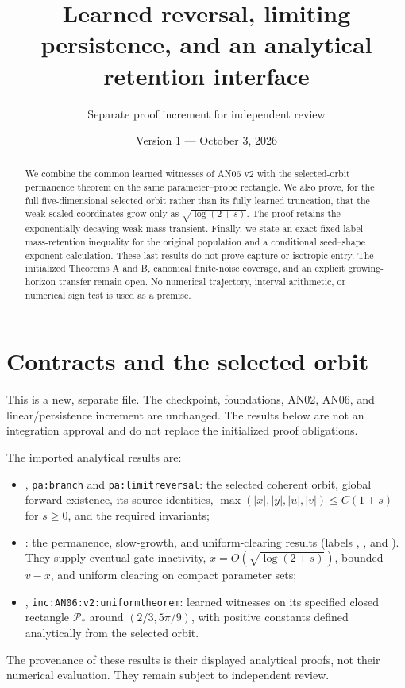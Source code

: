 \documentclass[11pt]{article}
\title{Learned reversal, limiting persistence, and an analytical retention interface}
\author{Separate proof increment for independent review}
\date{Version 1 --- October 3, 2026}
\numberwithin{equation}{section}
\theoremstyle{remark}\newtheorem{remark}[theorem]{Remark}
\begin{document}
\maketitle

\begin{abstract}
We combine the common learned witnesses of AN06 v2 with the selected-orbit
permanence theorem on the same parameter--probe rectangle. We also prove,
for the full five-dimensional selected orbit rather than its fully learned
truncation, that the weak scaled coordinates grow only as
$\sqrt{\log(2+s)}$. The proof retains the exponentially decaying weak-mass
transient. Finally, we state an exact fixed-label mass-retention inequality
for the original population and a conditional seed--shape exponent
calculation. These last results do not prove capture or isotropic entry.
The initialized Theorems A and B, canonical finite-noise coverage, and an
explicit growing-horizon transfer remain open. No numerical trajectory,
interval arithmetic, or numerical sign test is used as a premise.
\end{abstract}

\section{Contracts and the selected orbit}\label{inc:LPR:v1:contract}
This is a new, separate file. The checkpoint, foundations, AN02, AN06, and
linear/persistence increment are unchanged. The results below are not an
integration approval and do not replace the initialized proof obligations.

The imported analytical results are:
\begin{itemize}
\item \cite{P}, \texttt{pa:branch} and \texttt{pa:limitreversal}: the selected
coherent orbit, global forward existence, its source identities,
$\max(|x|,|y|,|u|,|v|)\le C(1+s)$ for $s\ge0$, and the required invariants;
\item \cite{LP}: the permanence, slow-growth, and uniform-clearing
results (labels ,
, and
). They supply eventual gate inactivity,
$x=O(\sqrt{\log(2+s)})$, bounded $v-x$, and uniform clearing on compact
parameter sets;
\item \cite{W}, \texttt{inc:AN06:v2:uniformtheorem}: learned witnesses on
its specified closed rectangle $\mathcal P_*$ around $(2/3,5\pi/9)$, with
positive constants defined analytically from the selected orbit.
\end{itemize}
The provenance of these results is their displayed analytical proofs, not
their numerical evaluation. They remain subject to independent review.
\end{document}
